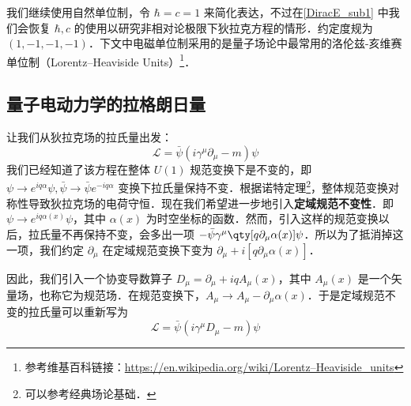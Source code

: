 

我们继续使用自然单位制，令 $\hbar=c=1$ 来简化表达，不过在\autoref{DiracE_sub1} 中我们会恢复 $\hbar,c$ 的使用以研究非相对论极限下狄拉克方程的情形．约定度规为 $(1,-1,-1,-1)$．下文中电磁单位制采用的是量子场论中最常用的洛伦兹-亥维赛单位制（Lorentz–Heaviside Units）\footnote{参考维基百科链接：\href{https://en.wikipedia.org/wiki/Lorentz–Heaviside_units}{https://en.wikipedia.org/wiki/Lorentz–Heaviside_units}}．

\subsection{量子电动力学的拉格朗日量}
让我们从狄拉克场的拉氏量出发：
\begin{equation}
\mathcal{L}=\bar\psi (i\gamma^\mu \partial_\mu - m)\psi 
\end{equation}
我们已经知道了该方程在整体 $U(1)$ 规范变换下是不变的，即 $\psi\rightarrow e^{iq\alpha}\psi,\bar\psi \rightarrow \bar\psi e^{-iq\alpha}$ 变换下拉氏量保持不变．根据诺特定理\footnote{可以参考经典场论基础．}，整体规范变换对称性导致狄拉克场的电荷守恒．现在我们希望进一步地引入\textbf{定域规范不变性}．即 $\psi\rightarrow e^{iq\alpha(x)}\psi $，其中 $\alpha(x)$ 为时空坐标的函数．然而，引入这样的规范变换以后，拉氏量不再保持不变，会多出一项 $-\bar\psi \gamma^\mu \qty[q\partial_\mu \alpha(x)]\psi$．所以为了抵消掉这一项，我们约定 $\partial_\mu$ 在定域规范变换下变为 $\partial_\mu+i[q\partial_\mu \alpha(x)]$．

因此，我们引入一个协变导数算子 $D_\mu = \partial_\mu +iqA_\mu(x)$，其中 $A_\mu(x)$ 是一个矢量场，也称它为规范场．在规范变换下，$A_\mu\rightarrow A_\mu - \partial_\mu \alpha(x)$．于是定域规范不变的拉氏量可以重新写为
\begin{equation}
\mathcal{L}=\bar\psi(i\gamma^\mu D_\mu-m)\psi 
\end{equation}

